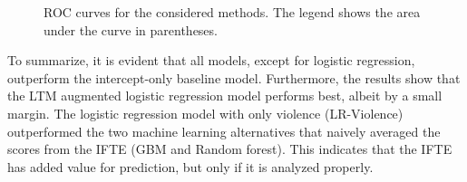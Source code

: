 \documentclass[a4paper,11pt]{article}
\begin{document}
\begin{figure}[!ht]
    \centering
    
    \caption{ROC curves for the considered methods. The legend shows the area under the curve in parentheses.}
    \label{fig:roc_curves}
\end{figure}

To summarize, it is evident that all models, except for logistic regression, outperform the intercept-only baseline model.
Furthermore, the results show that the LTM augmented logistic regression model performs best, albeit by a small margin.
The logistic regression model with only violence (LR-Violence) outperformed the two machine learning alternatives that naively averaged the scores from the IFTE (GBM and Random forest).
This indicates that the IFTE has added value for prediction, but only if it is analyzed properly.
\end{document}
